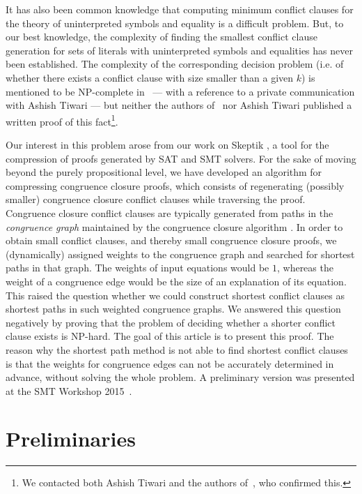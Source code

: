 \documentclass[smallextended]{svjour3}
\begin{document}
It has also been common knowledge that computing minimum conflict clauses for
the theory of uninterpreted symbols and equality is a difficult problem.  But,
to our best knowledge, the complexity of finding the smallest conflict clause generation
for sets of literals with uninterpreted symbols and equalities has never been
established.  The complexity of the corresponding decision problem (i.e. of whether there exists a conflict clause with size smaller than a given $k$) is mentioned to be NP-complete in~\cite{Nieuwenhuis6} --- with
a reference to a private communication with Ashish Tiwari --- but neither the
authors of~\cite{Nieuwenhuis6} nor Ashish Tiwari published a written proof of
this fact\footnote{We contacted both Ashish Tiwari and the authors
  of~\cite{Nieuwenhuis6}, who confirmed this.}.

Our interest in this problem arose from our work on Skeptik \cite{Boudou1}, a tool for the compression of proofs generated by SAT and SMT solvers. For the sake of moving beyond the purely propositional level, we have developed an algorithm for compressing congruence closure proofs, which consists of regenerating (possibly smaller) congruence closure conflict clauses while traversing the proof. 
Congruence closure conflict clauses are typically generated from paths in the \emph{congruence graph} maintained by the congruence closure algorithm \cite{Fontaine2004,Nieuwenhuis6,Nieuwenhuis9}. 
In order to obtain small conflict clauses, and thereby small congruence closure proofs, we (dynamically) assigned weights to the congruence graph and searched for shortest paths in that graph.
The weights of input equations would be $1$, whereas the weight of a congruence edge would be the size of an explanation of its equation.
This raised the question whether we could construct shortest conflict clauses as shortest paths in such weighted congruence graphs. 
We answered this question negatively by proving that the problem of deciding whether a shorter conflict clause exists is NP-hard. 
The goal of this article is to present this proof.
The reason why the shortest path method is not able to find shortest conflict clauses is that the weights for congruence edges can not be accurately determined in advance, without solving the whole problem.
A preliminary version was presented at the SMT Workshop 2015~\cite{Fellner1}.

\section{Preliminaries}
\end{document}
